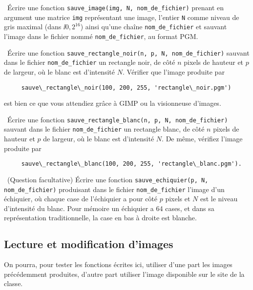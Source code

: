 \question\ Écrire une fonction \texttt{sauve\_image(img, N, nom\_de\_fichier)} prenant en argument
  une matrice \texttt{img} représentant une image, l'entier \texttt{N} comme
  niveau de gris maximal (dans $\ii{0,2^{16}}$) ainsi qu'une chaîne \texttt{nom\_de\_fichier} et
  sauvant l'image dans le fichier nommé \texttt{nom\_de\_fichier}, au format PGM.
  
\question\ Écrire une fonction \texttt{sauve\_rectangle\_noir(n, p, N, nom\_de\_fichier)}
  sauvant dans le fichier \texttt{nom\_de\_fichier} un rectangle noir, de côté
  $n$ pixels de hauteur et $p$ de largeur, où le blanc est
  d'intensité $N$. Vérifier que l'image produite par
   \begin{lstlisting}
     sauve\_rectangle\_noir(100, 200, 255, 'rectangle\_noir.pgm')
   \end{lstlisting}
  est bien ce que   vous attendiez grâce à GIMP ou la visionneuse d'images.
  
\question\ Écrire une fonction
   \texttt{sauve\_rectangle\_blanc(n, p, N, nom\_de\_fichier)}
   sauvant dans le fichier   \texttt{nom\_de\_fichier} un rectangle blanc, de côté $n$ pixels de hauteur et $p$ de
   largeur, où le blanc est d'intensité $N$. De même, vérifiez l'image
   produite par
   \begin{lstlisting}
     sauve\_rectangle\_blanc(100, 200, 255, 'rectangle\_blanc.pgm'). 
   \end{lstlisting}
   
\question\ (Question facultative) Écrire une fonction \texttt{sauve\_echiquier(p, N, nom\_de\_fichier)} produisant
   dans le fichier \texttt{nom\_de\_fichier} l'image d'un échiquier, où chaque case de
   l'échiquier a pour côté $p$ pixels et $N$ est le niveau d'intensité
   du blanc. Pour mémoire un échiquier a 64 cases, et dans sa
   représentation traditionnelle, la case en bas à droite est blanche.


 \subsection*{Lecture et modification d'images}
 
 On pourra, pour tester les fonctions écrites ici, utiliser d'une part
 les images précédemment produites, d'autre part utiliser l'image
 disponible sur le site de la classe.

